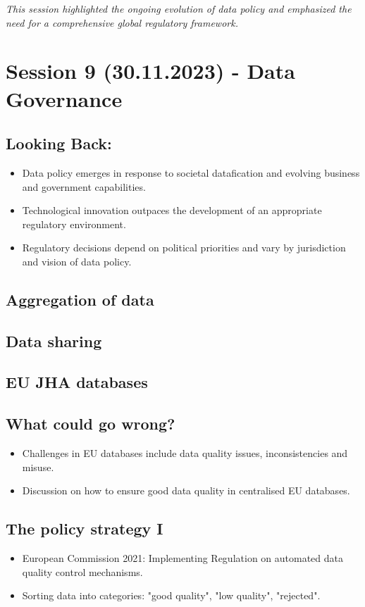 \documentclass{article}
\begin{document}
\textit{This session highlighted the ongoing evolution of data policy and emphasized the need for a comprehensive global regulatory framework.}
\section*{Session 9 (30.11.2023) - Data Governance}

\subsection*{Looking Back:}
\begin{itemize}
    \item Data policy emerges in response to societal datafication and evolving business and government capabilities.
    \item Technological innovation outpaces the development of an appropriate regulatory environment.
    \item Regulatory decisions depend on political priorities and vary by jurisdiction and vision of data policy.
\end{itemize}

\subsection*{Aggregation of data}
\subsection*{Data sharing}
\subsection*{EU JHA databases}

\subsection*{What could go wrong?}
\begin{itemize}
    \item Challenges in EU databases include data quality issues, inconsistencies and misuse.
    \item Discussion on how to ensure good data quality in centralised EU databases.
\end{itemize}

\subsection*{The policy strategy I}
\begin{itemize}
    \item European Commission 2021: Implementing Regulation on automated data quality control mechanisms.
    \item Sorting data into categories: "good quality", "low quality", "rejected".
\end{itemize}
\end{document}
